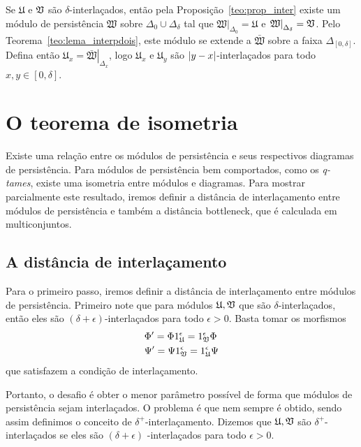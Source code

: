 Se $\mathfrak{U}$ e $\mathfrak{V}$ são $\delta$-interlaçados, então 
pela Proposição~\ref{teo:prop_inter} existe um módulo de 
persistência $\mathfrak{W}$ sobre $\Delta_0 \cup \Delta_\delta$ tal
que $\left.\mathfrak{W}\right|_{\Delta_0} = \mathfrak{U}$ e 
$\left.\mathfrak{W}\right|_{\Delta_\delta} = \mathfrak{V}$. Pelo 
Teorema~\ref{teo:lema_interpdois}, este módulo se extende a 
$\bar{\mathfrak{W}}$ sobre a faixa $\Delta_{[0,\delta]}$.
Defina então $\mathfrak{U}_x = \left.\bar{\mathfrak{W}}\right|_{
\Delta_x}$, logo $\mathfrak{U}_x$ e $\mathfrak{U}_y$ são 
$\left\lvert y-x\right\rvert$-interlaçados para todo $x,y\in [0, \delta]$. 

\section{O teorema de isometria}

Existe uma relação entre os módulos de persistência e seus respectivos diagramas 
de persistência. Para módulos de persistência bem comportados, como os 
\textit{q-tames}, existe uma isometria entre módulos e diagramas. Para mostrar 
parcialmente este resultado, iremos definir a distância de interlaçamento entre
módulos de persistência e também a distância bottleneck, que é calculada
em multiconjuntos. 

\subsection{A distância de interlaçamento}

Para o primeiro passo, iremos definir a distância de interlaçamento entre
módulos de persistência. Primeiro note que para módulos 
$\mathfrak{U},  \mathfrak{V}$ que são $\delta$-interlaçados, então eles
são $(\delta+\epsilon)$-interlaçados para todo $\epsilon > 0$. Basta tomar
os morfismos
\begin{align*}
    & \Phi' = \Phi 1_{\mathfrak{U}}^\epsilon = 1_{\mathfrak{V}}^\epsilon \Phi \\
    & \Psi' = \Psi 1_{\mathfrak{V}}^\epsilon = 1_{\mathfrak{U}}^\epsilon \Psi
\end{align*}
que satisfazem a condição de interlaçamento. 

Portanto, o desafio é obter o menor parâmetro possível de forma que módulos
de persistência sejam interlaçados. O problema é que nem sempre é obtido, 
sendo assim definimos o conceito de $\delta^+$-interlaçamento. Dizemos que 
$\mathfrak{U}, \mathfrak{V}$ são $\delta^+$-interlaçados se eles são $(\delta + \epsilon)$
-interlaçados para todo $\epsilon > 0$. 

